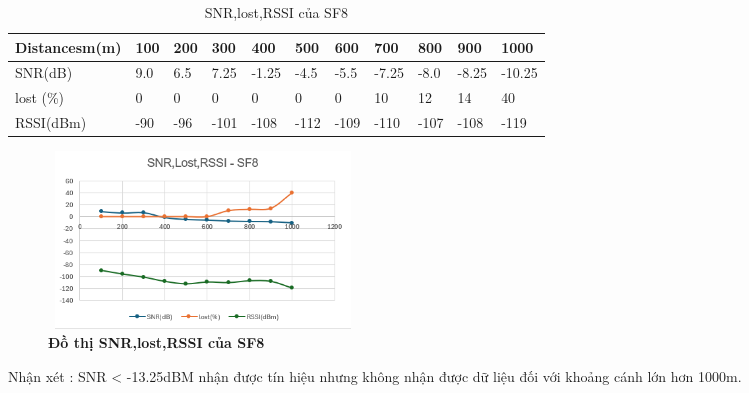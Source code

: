\documentclass{article} %
\begin{document}
	\begin{table}[H]
		\centering
		\begin{tabular}{|l|l|l|l|l|l|l|l|l|l|l|}
			\hline
			\textbf{Distancesm(m)} & \textbf{100} & \textbf{200} & \textbf{300} & \textbf{400} & \textbf{500} & \textbf{600} & \textbf{700} & \textbf{800} & \textbf{900} & \textbf{1000} \\ \hline
			SNR(dB)      & 9.0          & 6.5          & 7.25         & -1.25         & -4.5         & -5.5         & -7.25         & -8.0         & -8.25         & -10.25           \\ \hline
			lost (\%)& 0         & 0         & 0         & 0        & 0         & 0        & 10          & 12         & 14         & 40           \\ \hline
			RSSI(dBm)  & -90          & -96          & -101         & -108         & -112         & -109         & -110         & -107         & -108         & -119          \\ \hline
		\end{tabular}
		\caption{SNR,lost,RSSI của SF8}
		\label{SF8}
	\end{table}
	
	\begin{figure}[!ht]
		\centering
		\includegraphics[width=8.2cm,height=4.7cm]{Images/sf8.png}
		\caption[ Đồ thị SNR,lost,RSSI của SF8 ]{\bfseries \fontsize{12pt}{0pt}\selectfont  Đồ thị SNR,lost,RSSI của SF8}
		\label{sf8}
	\end{figure}
	
	Nhận xét : SNR < -13.25dBM nhận được tín hiệu nhưng không nhận được dữ liệu đối với khoảng cánh lớn hơn 1000m.
	
\end{document}
